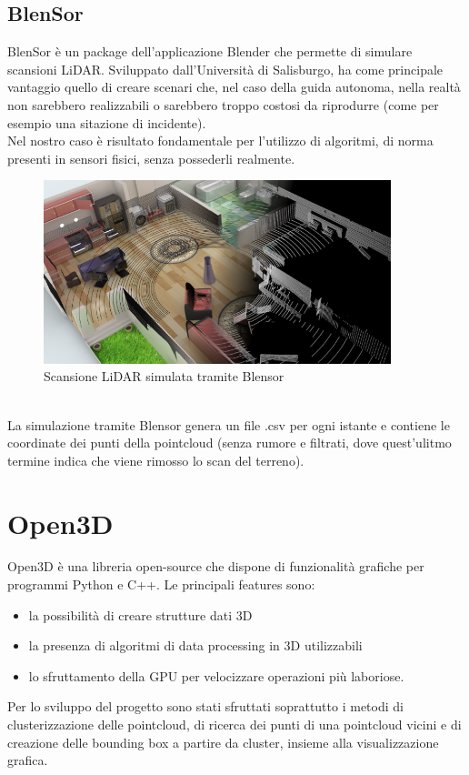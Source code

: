 \documentclass[italian]{report}
\begin{document}
\subsection{BlenSor}
BlenSor è un package dell'applicazione Blender che permette di simulare scansioni LiDAR. Sviluppato dall'Università di Salisburgo, ha come principale vantaggio quello di creare scenari che, nel caso della guida autonoma, nella realtà non sarebbero realizzabili o sarebbero troppo costosi da riprodurre (come per esempio una sitazione di incidente).\\
Nel nostro caso è risultato fondamentale per l'utilizzo di algoritmi, di norma presenti in sensori fisici, senza possederli realmente.\\
\begin{figure}[H]
	\centering
	\includegraphics[width=0.9\textwidth]{Blensor}
	\footnotesize
	\caption{Scansione LiDAR simulata tramite Blensor}
\end{figure}\\
La simulazione tramite Blensor genera un file .csv per ogni istante e contiene le coordinate dei punti della pointcloud (senza rumore e filtrati, dove quest'ulitmo termine indica che viene rimosso lo scan del terreno).
\section{Open3D}
Open3D è una libreria open-source che dispone di funzionalità grafiche per programmi Python e C++\cite{Open3D}. Le principali features sono:
\begin{itemize}
	\item la possibilità di creare strutture dati 3D
	\item la presenza di algoritmi di data processing in 3D utilizzabili 
	\item lo sfruttamento della GPU per velocizzare operazioni più laboriose.
\end{itemize}
Per lo sviluppo del progetto sono stati sfruttati soprattutto i metodi di clusterizzazione delle pointcloud, di ricerca dei punti di una pointcloud vicini e di creazione delle bounding box a partire da cluster, insieme alla visualizzazione grafica.
\end{document}
